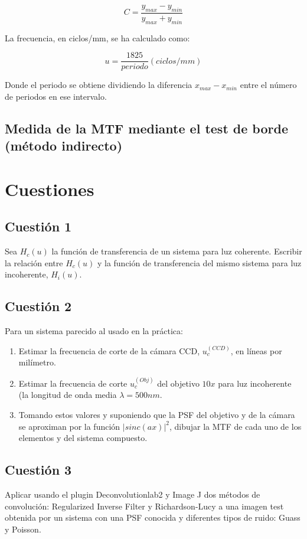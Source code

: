 \documentclass[12pt,a5paper]{article}
\begin{document}
\begin{equation}
        C = \frac{y_{max} - y_{min}}{y_{max} + y_{min}}
    \label{contraste}
\end{equation}

La frecuencia, en ciclos/mm, se ha calculado como:

\begin{equation}
        u = \frac{1825}{periodo} (ciclos/mm)
    \label{frecuencia}
\end{equation}

Donde el periodo se obtiene dividiendo la diferencia $x_{max} - x_{min}$ entre el número de periodos en ese intervalo.

\subsection{Medida de la MTF mediante el test de borde (método indirecto)}

\section{Cuestiones}

\subsection{Cuestión 1}
Sea $H_{c}(u)$ la función de transferencia de un sistema para luz coherente. Escribir la relación entre $H_{c}(u)$ y la función de transferencia del mismo sistema para luz incoherente, $H_{i}(u)$.


\subsection{Cuestión 2}
Para un sistema parecido al usado en la práctica:
\begin{enumerate}
    \item Estimar la frecuencia de corte de la cámara CCD, $u_{c}^{(CCD)}$, en líneas por milímetro.
    \item Estimar la frecuencia de corte $u_{c}^{(Obj)}$ del objetivo $10x$ para luz incoherente (la longitud de onda media $\lambda=500nm$.
    \item Tomando estos valores y suponiendo que la PSF del objetivo y de la cámara se aproximan por la función $|sinc(ax)|^2$, dibujar la MTF de cada uno de los elementos y del sistema compuesto.
\end{enumerate}


\subsection{Cuestión 3}
Aplicar usando el plugin Deconvolutionlab2 y Image J dos métodos de convolución: Regularized Inverse Filter y Richardson-Lucy a una imagen test obtenida por un sistema con una PSF conocida y diferentes tipos de ruido: Guass y Poisson.
\end{document}
